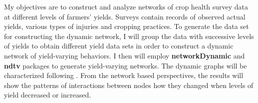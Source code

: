 
My objectives are to construct and analyze networks of crop health survey data at different levels of farmers' yields. Surveys contain records of observed actual yields, various types of injuries and cropping practices. To generate the data set for constructing the dynamic network, I will group the data with successive levels of yields to obtain different yield data sets in order to construct a dynamic network of yield-varying behaviors. I then will employ \textbf{networkDynamic}  and \textbf{ndtv}  packages to generate yield-varying networks. The dynamic graphs will be characterized following . From the network based perspectives, the results will show the patterns of interactions between nodes how they changed when levels of yield decreased or increased.






